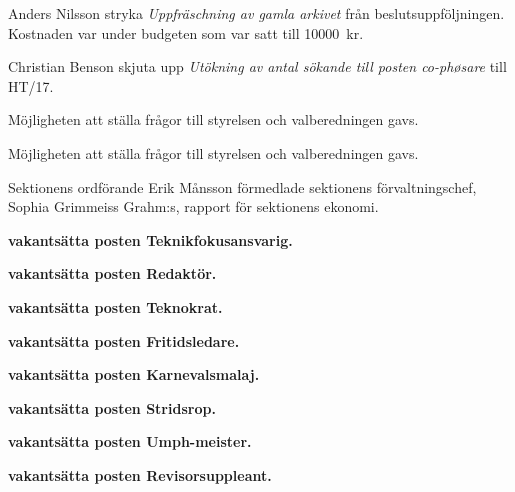 \documentclass[10pt]{article}
\begin{document}
\begin{paragrafer}
\Mbaby

Anders Nilsson \ypa stryka \emph{Uppfräschning av gamla arkivet} från beslutsuppföljningen. Kostnaden var under budgeten som var satt till \SI{10000}{kr}.

\Mbaby

Christian Benson \ypa skjuta upp \emph{Utökning av antal sökande till posten co-phøsare} till HT/17.

\Mbaby

Möjligheten att ställa frågor till styrelsen och valberedningen gavs.

Möjligheten att ställa frågor till styrelsen och valberedningen gavs.

Sektionens ordförande Erik Månsson förmedlade sektionens förvaltningschef, Sophia Grimmeiss Grahm:s, rapport för sektionens ekonomi.


\begin{paragrafer}
\end{paragrafer}
\end{paragrafer}

\textbf{\Mba vakantsätta posten Teknikfokusansvarig.}\par

\textbf{\Mba vakantsätta posten Redaktör.}\par

\textbf{\Mba vakantsätta posten Teknokrat.}\par

\textbf{\Mba vakantsätta posten Fritidsledare.}\par

\textbf{\Mba vakantsätta posten Karnevalsmalaj.}\par

\textbf{\Mba vakantsätta posten Stridsrop.}\par

\textbf{\Mba vakantsätta posten Umph-meister.}\par

\textbf{\Mba vakantsätta posten Revisorsuppleant.}\par
\end{document}
